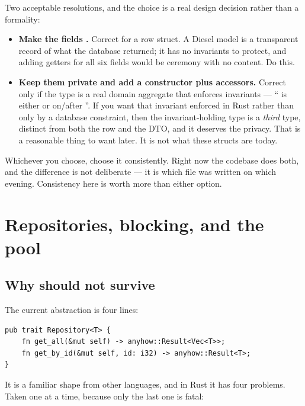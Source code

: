 Two acceptable resolutions, and the choice is a real design decision rather than a formality:

\begin{itemize}
  \item \textbf{Make the fields .} Correct for a row struct. A Diesel model is a
    transparent record of what the database returned; it has no invariants to protect, and adding
    getters for all six fields would be ceremony with no content. Do this.
  \item \textbf{Keep them private and add a constructor plus accessors.} Correct only if the type
    is a real domain aggregate that enforces invariants --- `` is either 
    or on/after ''. If you want that invariant enforced in Rust rather than only
    by a database  constraint, then the invariant-holding type is a \emph{third} type,
    distinct from both the row and the DTO, and it deserves the privacy. That is a reasonable thing
    to want later. It is not what these structs are today.
\end{itemize}

Whichever you choose, choose it consistently. Right now the codebase does both, and the difference
is not deliberate --- it is which file was written on which evening. Consistency here is worth
more than either option.

\chapter{Repositories, blocking, and the pool}
\label{ch:blocking}

\section{Why  should not survive}

The current abstraction is four lines:

\begin{lstlisting}[style=rs,caption={\file{src/core/mod.rs}, in full.}]
pub trait Repository<T> {
    fn get_all(&mut self) -> anyhow::Result<Vec<T>>;
    fn get_by_id(&mut self, id: i32) -> anyhow::Result<T>;
}
\end{lstlisting}

It is a familiar shape from other languages, and in Rust it has four problems. Taken one at a time,
because only the last one is fatal:

